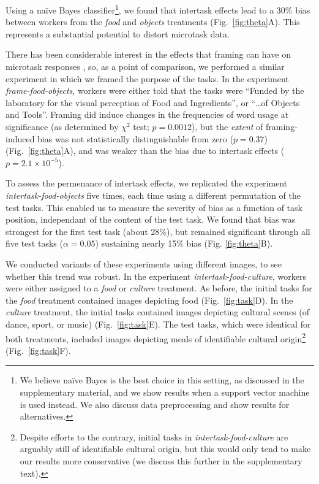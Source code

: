\documentclass[12pt]{article}
\begin{document}
Using a na\"ive Bayes classifier\footnote{
	We believe na\"ive Bayes is the best choice in this setting, as discussed
	in the supplementary material, and we show results when a support vector
	machine is used instead. 
	We also discuss data preprocessing and show results for alternatives.
}, we found that intertask effects 
lead to a 30\% bias between workers from the \textit{food} and 
\textit{objects} treatments (Fig.~\ref{fig:theta}A).  
This represents a substantial potential to distort microtask data.

There has been considerable interest in the effects that framing can have
on microtask responses
\cite{Kinnaird2012281,chandler2013breaking,thibodeau2013natural}, so,
as a point of comparison, we performed a similar experiment 
in which we framed the purpose of the tasks.  In the experiment 
\textit{frame-food-objects}, workers were either told that 
the tasks were ``Funded by the laboratory for the visual perception of Food 
and Ingredients'', or ``\ldots of Objects and Tools''.  
Framing did induce changes in the frequencies of 
word usage at significance (as determined by $\chi^2$ test; $p=0.0012$), but 
the \textit{extent} of framing-induced bias was not statistically 
distinguishable from zero ($p =0.37$) (Fig.~\ref{fig:theta}A), and was
weaker than the bias due to intertask effects ($p=2.1\times 10^{-5}$).

To assess the permenance of intertask effects, we replicated the experiment
\textit{intertask-food-objects} five times, each time using a different 
permutation of the test tasks.  This enabled us to measure the severity
of bias as a function of task position, independant of the content
of the test task.  We found that bias was strongest for the first test task
(about 28\%), but remained significant through all five test tasks 
($\alpha=0.05$) sustaining nearly 15\% bias (Fig. \ref{fig:theta}B).

We conducted variants of these experiments using different images, to see 
whether this trend was robust.  In the experiment 
\textit{intertask-food-culture},
workers were either assigned to a \textit{food} or \textit{culture} treatment.
As before, the initial tasks for the \textit{food} treatment contained images 
depicting food (Fig.~\ref{fig:task}D). 
In the \textit{culture} treatment, 
the initial tasks contained images depicting cultural scenes 
(of dance, sport, or music) (Fig.~\ref{fig:task}E).  The test tasks, which were identical for both
treatments, included images depicting meals of identifiable cultural 
origin\footnote{
	Despite efforts to the contrary, initial tasks 
	in \textit{intertask-food-culture} are arguably still of
	identifiable cultural origin, but this would only tend to make our 
	results more conservative (we discuss this further in the supplementary 
	text).
}
(Fig.~\ref{fig:task}F).  
\end{document}

